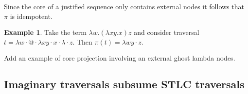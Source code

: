 \documentclass{article}
\theoremstyle{plain}
\theoremstyle{definition}
\newtheorem{example}{Example}[section]
\theoremstyle{remark}
\def\coresymbol{\pi} %
\begin{document}
Since the core of a justified sequence only contains external nodes it follows that $\coresymbol$ is idempotent.

\begin{example}Take the term $\lambda w . (\lambda x y .x) z$ and consider traversal $t = \lambda w\cdot @ \cdot \lambda x y\cdot x\cdot\lambda \cdot z$.
    Then $\coresymbol(t) = \lambda wy \cdot z$.
\end{example}

\begin{todobox}
Add an example of core projection involving an external ghost lambda nodes.
\end{todobox}

\subsection{Imaginary traversals subsume STLC traversals}
\end{document}
